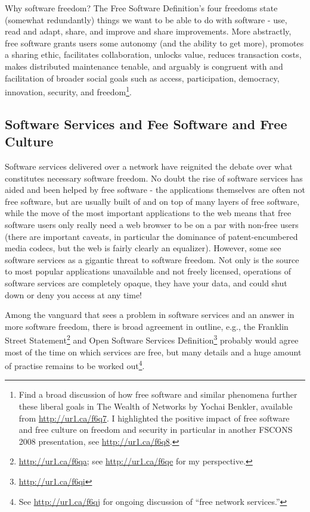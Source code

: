 Why software freedom? The Free Software Def\hbox{}inition's four freedoms state
(somewhat redundantly) things we want to be able to do with software - use, read
and adapt, share, and improve and share improvements. More abstractly, free
software grants users some autonomy (and the ability to get more), promotes a
sharing ethic, facilitates collaboration, unlocks value, reduces transaction
costs, makes distributed maintenance tenable, and arguably is congruent with and
facilitation of broader social goals such as access, participation, democracy,
innovation, security, and freedom\footnote{F\hbox{}ind a broad discussion of how
free software and similar phenomena further these liberal goals in The Wealth of
Networks by Yochai Benkler, available from \url{http://ur1.ca/f6q7}. I
highlighted the positive impact of free software and free culture on freedom and
security in particular in another FSCONS 2008 presentation, see
\url{http://ur1.ca/f6q8}.}.


\subsection{Software Services and Fee Software and Free Culture}
\label{ss:free_culture_software_freedom:freedom:software_services}

Software services delivered over a network have reignited the debate over what
constitutes necessary software freedom. No doubt the rise of software services
has aided and been helped by free software - the applications themselves are
often not free software, but are usually built of and on top of many layers of
free software, while the move of the most important applications to the web
means that free software users only really need a web browser to be on a par
with non-free users (there are important caveats, in particular the dominance of
patent-encumbered media codecs, but the web is fairly clearly an equalizer).
However, some see software services as a gigantic threat to software freedom.
Not only is the source to most popular applications unavailable and not freely
licensed, operations of software services are completely opaque, they have your
data, and could shut down or deny you access at any time!

Among the vanguard that sees a problem in software services and an answer in
more software freedom, there is broad agreement in outline, e.g., the Franklin
Street Statement\footnote{\url{http://ur1.ca/f6qa}; see \url{http://ur1.ca/f6qe}
for my perspective.} and Open Software Services
Def\hbox{}inition\footnote{\url{http://ur1.ca/f6qi}} probably would agree most
of the time on which services are free, but many details and a huge amount of
practise remains to be worked out\footnote{See \url{http://ur1.ca/f6qj} for
ongoing discussion of ``free network services.''}.

